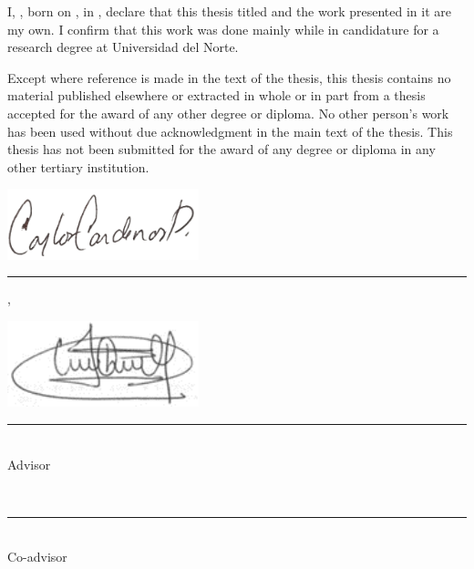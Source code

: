 
\noindent I, {\myFirstName} {\myLastName}, born on {\myBirthMonth} {\myBirthDay}, {\myBirthYear} in {\myBirthPlace}, declare that this thesis titled \emph{\myTitle} and the work presented in it are my own. I confirm that this work was done mainly while in candidature for a research degree at Universidad del Norte.

Except where reference is made in the text of the thesis, this thesis contains no material published elsewhere or extracted in whole or in part from a thesis accepted for the award of any other degree or diploma. No other person's work has been used without due acknowledgment in the main text of the thesis. This thesis has not been submitted for the award of any degree or diploma in any other tertiary institution.

\vspace{5em}


\noindent\hspace{0.5em}\includegraphics[width=15em]{figures/signature}\\
\noindent\rule[1em]{16.5em}{0.5pt}

\vspace{-1.5em}
\noindent {\myFirstName} {\myLastName} \hspace{12em} {\mySubmissionMonth} {\mySubmissionDay}, {\mySubmissionYear}

\vspace{5em}


\noindent\hspace{0.5em}\includegraphics[width=15em]{figures/CQ_Sign.png}\\
\noindent\rule[1em]{16.5em}{0.5pt}

\vspace{-1.5em}
\noindent {\myProfTitle} {\myProfFirstName}{ \myProfLastName}\\
Advisor

\vspace{5em}
\noindent\hspace{0.5em}\\
\noindent\rule[1em]{16.5em}{0.5pt}

\vspace{-1.5em}
\noindent {\myOtherProfTitle} {\myOtherProfFirstName}{ \myOtherProfLastName}\\
Co-advisor
